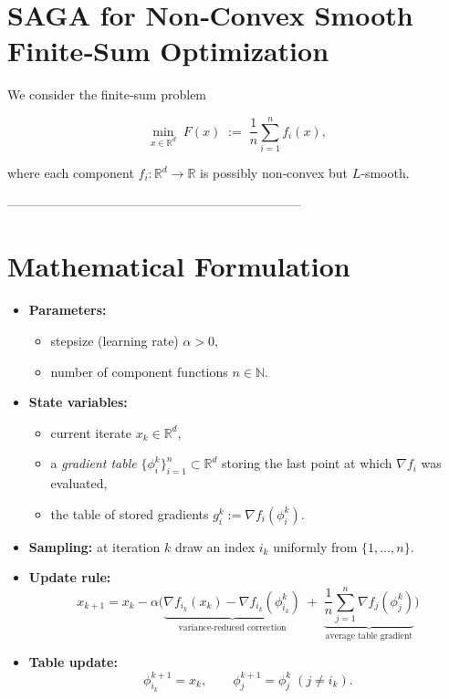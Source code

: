 \documentclass{article}
\newcommand{\R}{\mathbb{R}}
\begin{document}
\section*{SAGA for Non‑Convex Smooth Finite‑Sum Optimization}

We consider the finite‑sum problem  

\[
\min_{x\in\R^{d}} \; F(x)\;:=\;\frac1n\sum_{i=1}^{n} f_i(x),
\tag{1}
\]

where each component $f_i:\R^{d}\rightarrow\R$ is possibly non‑convex but $L$‑smooth.

---------------------------------------------------------------------

\section*{Mathematical Formulation}

\begin{itemize}
\item \textbf{Parameters:}
  \begin{itemize}
  \item stepsize (learning rate) $\alpha>0$,
  \item number of component functions $n\in\mathbb{N}$.
  \end{itemize}
\item \textbf{State variables:}
  \begin{itemize}
  \item current iterate $x_k\in\R^{d}$,
  \item a \emph{gradient table} $\{\phi_i^k\}_{i=1}^{n}\subset\R^{d}$ storing the last point at which $\nabla f_i$ was evaluated,
  \item the table of stored gradients $g_i^k:=\nabla f_i(\phi_i^k)$.
  \end{itemize}
\item \textbf{Sampling:} at iteration $k$ draw an index $i_k$ uniformly from $\{1,\dots,n\}$.
\item \textbf{Update rule:}
  \[
  \boxed{
  x_{k+1}=x_k-\alpha \Big( \underbrace{\nabla f_{i_k}(x_k)-\nabla f_{i_k}(\phi_{i_k}^k)}_{\text{variance‑reduced correction}}
  \;+\; \underbrace{\frac1n\sum_{j=1}^{n}\nabla f_{j}(\phi_{j}^k)}_{\text{average table gradient}}\Big)
  } \tag{2}
  \]
\item \textbf{Table update:}
  \[
  \phi_{i_k}^{k+1}=x_k,\qquad 
  \phi_{j}^{k+1}=\phi_{j}^{k}\;(j\neq i_k).
  \tag{3}
  \]
\end{itemize}
\end{document}
